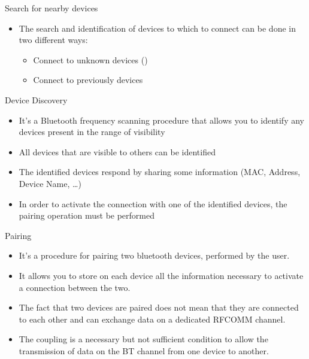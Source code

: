 \documentclass{beamer}
\begin{document}
  \begin{frame}[allowframebreaks]{Search for nearby devices}
    \begin{itemize}
      \item The search and identification of devices to which to connect can be
      done in two different ways:
      \begin{itemize}
        \item Connect to unknown devices ()
        \item Connect to previously  devices
      \end{itemize}
    \end{itemize}

    \begin{block}{Device Discovery}
      \begin{itemize}
        \item It's a Bluetooth frequency scanning procedure that allows you to
        identify any devices present in the range of visibility
        \item All devices that are visible to others can be identified
        \item The identified devices respond by sharing some information (MAC,
        Address, Device Name, \dots)
        \item In order to activate the connection with one of the identified
        devices, the pairing operation must be performed
      \end{itemize}
    \end{block}

    \begin{block}{Pairing}
      \begin{itemize}\itemsep5pt
        \item It's a procedure for pairing two bluetooth devices, performed by
        the user.
        \item It allows you to store on each device all the information
        necessary to activate a connection between the two.
        \item The fact that two devices are paired does not mean that they are
        connected to each other and can exchange data on a dedicated RFCOMM
        channel.
        \item The coupling is a necessary but not sufficient condition to allow
        the transmission of data on the BT channel from one device to another.
      \end{itemize}
    \end{block}
  \end{frame}
\end{document}
